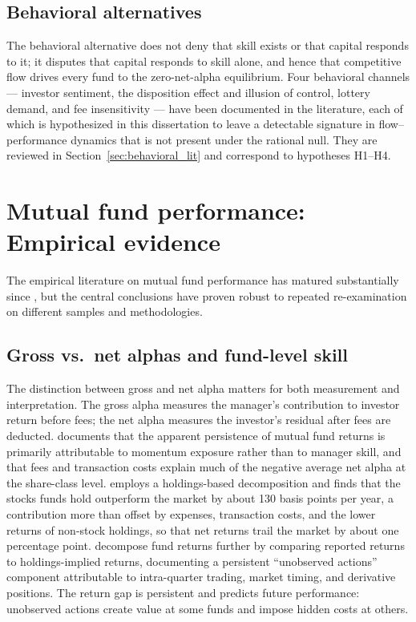 \documentclass[12pt, oneside]{report}
\begin{document}
\subsection{Behavioral alternatives}
\label{sec:behavioral_alternatives}

\noindent The behavioral alternative does not deny that skill exists or that
capital responds to it; it disputes that capital responds to skill
alone, and hence that competitive flow drives every fund to the
zero-net-alpha equilibrium. Four behavioral channels --- investor
sentiment, the disposition effect and illusion of control, lottery
demand, and fee insensitivity --- have been documented in the literature,
each of which is hypothesized in this dissertation to leave a detectable
signature in flow--performance dynamics that is not present under the
rational null. They are reviewed in Section~\ref{sec:behavioral_lit} and
correspond to hypotheses H1--H4.

\section{Mutual fund performance: Empirical evidence}
\label{sec:performance_evidence}

\noindent The empirical literature on mutual fund performance has matured
substantially since \textcite{Jensen1968}, but the central conclusions
have proven robust to repeated re-examination on different samples and
methodologies.

\subsection{Gross vs.\ net alphas and fund-level skill}
\label{sec:gross_net}

\noindent The distinction between gross and net alpha matters for both
measurement and interpretation. The gross alpha measures the manager's
contribution to investor return before fees; the net alpha measures the
investor's residual after fees are deducted. \textcite{Carhart1997}
documents that the apparent persistence of mutual fund returns is
primarily attributable to momentum exposure rather than to manager
skill, and that fees and transaction costs explain much of the negative
average net alpha at the share-class level. \textcite{Wermers2000}
employs a holdings-based decomposition and finds that the stocks funds
hold outperform the market by about 130 basis points per year, a
contribution more than offset by expenses, transaction costs, and the
lower returns of non-stock holdings, so that net returns trail the
market by about one percentage point. \textcite{KacperczykSialmZheng2008} decompose fund
returns further by comparing reported returns to holdings-implied returns,
documenting a persistent ``unobserved actions'' component attributable to
intra-quarter trading, market timing, and derivative positions. The
return gap is persistent and predicts future performance: unobserved
actions create value at some funds and impose hidden costs at others.
\end{document}
